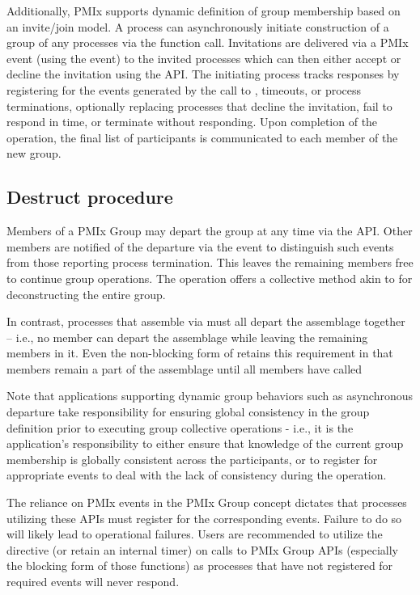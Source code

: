 Additionally, \ac{PMIx} supports dynamic definition of group membership based on an invite/join model. A process can asynchronously initiate construction of a group of any processes via the  function call. Invitations are delivered via a \ac{PMIx} event (using the  event) to the invited processes which can then either accept or decline the invitation using the  \ac{API}. The initiating process tracks responses by registering for the events generated by the call to , timeouts, or process terminations, optionally replacing processes that decline the invitation, fail to respond in time, or terminate without responding. Upon completion of the operation, the final list of participants is communicated to each member of the new group.

\subsection{Destruct procedure}

Members of a \ac{PMIx} Group may depart the group at any time via the  \ac{API}. Other members are notified of the departure via the  event to distinguish such events from those reporting process termination. This leaves the remaining members free to continue group operations. The  operation offers a collective method akin to  for deconstructing the entire group.

In contrast, processes that assemble via  must all depart the assemblage together – i.e., no member can depart the assemblage while leaving the remaining members in it. Even the non-blocking form of  retains this requirement in that members remain a part of the assemblage until all members have called 

Note that applications supporting dynamic group behaviors such as asynchronous departure take responsibility for ensuring global consistency in the group definition prior to executing group collective operations - i.e., it is the application's responsibility to either ensure that knowledge of the current group membership is globally consistent across the participants, or to register for appropriate events to deal with the lack of consistency during the operation.

\adviceuserstart
The reliance on \ac{PMIx} events in the \ac{PMIx} Group concept dictates that processes utilizing these \acp{API} must register for the corresponding events. Failure to do so will likely lead to operational failures. Users are recommended to utilize the  directive (or retain an internal timer) on calls to \ac{PMIx} Group \acp{API} (especially the blocking form of those functions) as processes that have not registered for required events will never respond.
\adviceuserend

